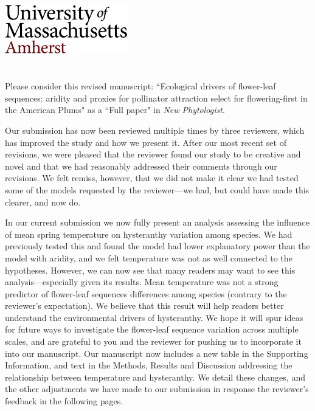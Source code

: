 \documentclass{article}[12pt]
\begin{document}

\noindent\includegraphics[width=0.4\textwidth]{umasslogo}\\\\

\\

\noindent Please consider this revised manuscript: ``Ecological drivers of flower-leaf sequences: aridity and proxies for pollinator attraction select for flowering-first in the American Plums" as a ``Full paper" in \textit{New Phytologist}.

Our submission has now been reviewed multiple times by three reviewers, which has improved the study and how we present it. After our most recent set of revisions, we were pleased that the reviewer found our study to be creative and novel and that we had reasonably addressed their comments through our revisions. We felt remiss, however, that we did not make it clear we had tested some of the models requested by the reviewer---we had, but could have made this clearer, and now do. 

In our current submission we now fully present an analysis assessing the influence of mean spring temperature on hysteranthy variation among species. We had previously tested this and found the model had lower explanatory power than the model with aridity, and we felt temperature was not as well connected to the hypotheses. However, we can now see that many readers may want to see this analysis---especially given its results. Mean temperature was not a strong predictor of flower-leaf sequences differences among species (contrary to the reviewer's expectation). We believe that this result will help readers better understand the environmental drivers of hysteranthy. We hope it will spur ideas for future ways to investigate the flower-leaf sequence variation across multiple scales, and are grateful to you and the reviewer for pushing us to incorporate it into our manuscript. Our manuscript now includes a new table in the Supporting Information, and text in the Methods, Results and Discussion addressing the relationship between temperature and hysteranthy. We detail these changes, and the other adjustments we have made to our submission in response the reviewer's feedback in the following pages.
\end{document}
